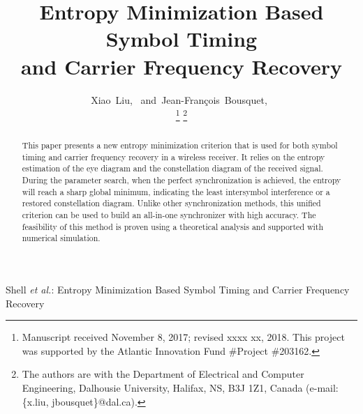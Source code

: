 \documentclass[journal,comsoc]{IEEEtran}
\begin{document}
%

\title{Entropy Minimization Based Symbol Timing
\\and Carrier Frequency Recovery}
\author{Xiao~Liu,~
        and~Jean-Fran\c{c}ois~Bousquet,~%

\thanks{Manuscript received November 8, 2017; revised xxxx xx, 2018. This project was supported by the Atlantic Innovation Fund \#Project \#203162.}
\thanks{The authors are with the Department of Electrical and Computer Engineering, Dalhousie University, Halifax,
NS, B3J 1Z1, Canada (e-mail: \{x.liu, jbousquet\}@dal.ca).}%
}

%
{Shell \MakeLowercase{\textit{et al.}}: Entropy Minimization Based Symbol Timing and Carrier Frequency Recovery}

\maketitle


\begin{abstract}
This paper  presents a new entropy minimization criterion that is used for both symbol timing and carrier frequency recovery in a wireless receiver.
It relies on the entropy estimation of the eye diagram and the constellation diagram of the received signal. 
During the parameter search, when the perfect synchronization is achieved, the entropy will reach a sharp global minimum, indicating the least intersymbol interference or a restored constellation diagram. 
Unlike other synchronization methods, this unified criterion can be used to build an all-in-one synchronizer with high accuracy.
The feasibility of this method is proven using a theoretical analysis and supported with numerical simulation. 
\end{abstract}
\end{document}
